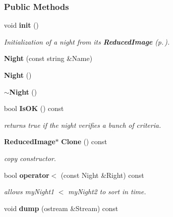 \subsubsection*{Public Methods}
\begin{CompactItemize}
\item 
{}
void {\bf init} ()\label{class_night_a0}

\begin{CompactList}\small\item\em Initialization of a night from its {\bf Reduced\-Image} {\rm (p.\,\pageref{class_reducedimage})}.\item\end{CompactList}\item 
{}
{\bf Night} (const string \&Name)\label{class_night_a1}

\item 
{}
{\bf Night} ()\label{class_night_a2}

\item 
{}
{\bf $\sim$Night} ()\label{class_night_a3}

\item 
{}
bool {\bf Is\-OK} () const\label{class_night_a4}

\begin{CompactList}\small\item\em returns true if the night verifies a bunch of criteria.\item\end{CompactList}\item 
{}
{\bf Reduced\-Image}$\ast$ {\bf Clone} () const\label{class_night_a5}

\begin{CompactList}\small\item\em copy constructor.\item\end{CompactList}\item 
{}
bool {\bf operator$<$} (const Night \&Right) const\label{class_night_a6}

\begin{CompactList}\small\item\em allows my\-Night1 $<$ my\-Night2 to sort in time.\item\end{CompactList}\item 
{}
void {\bf dump} (ostream \&Stream) const\label{class_night_a7}


\end{CompactItemize}
